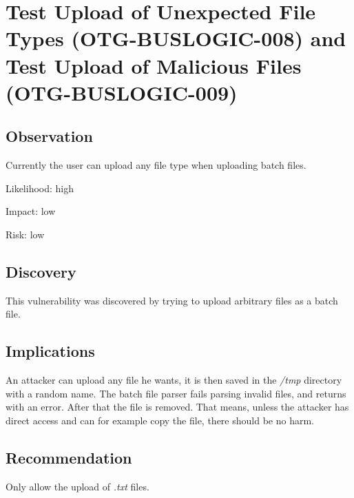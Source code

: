 \section{Test Upload of Unexpected File Types (OTG-BUSLOGIC-008) and Test Upload of Malicious Files (OTG-BUSLOGIC-009)}
\subsection{Observation}
Currently the user can upload any file type when uploading batch files.

Likelihood: high \newline

Impact: low\newline

Risk: low\newline
\subsection{Discovery}
This vulnerability was discovered by trying to upload arbitrary files as a batch file.
\subsection{Implications}
An attacker can upload any file he wants, it is then saved in the \textit{/tmp} directory with a random name. The batch file parser fails parsing invalid files, and returns with an error. After that the file is removed. That means, unless the attacker has direct access and can for example copy the file, there should be no harm.
\subsection{Recommendation}
Only allow the upload of \textit{.txt} files.
